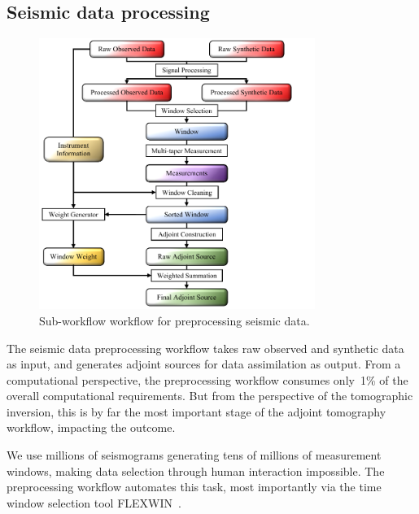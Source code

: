 \documentclass[extra,mreferee]{gji}
\begin{document}
\subsection{Seismic data processing}

\begin{figure}
  \centering
  \includegraphics[width=0.8\textwidth]{figures/Preprocess_workflow.pdf}
  \caption{\small{Sub-workflow workflow for preprocessing seismic data.}}
  \label{fig:preprocess_workflow}
\end{figure}

The seismic data preprocessing workflow takes raw observed and synthetic data as input,
and generates adjoint sources for data assimilation as output.
From a computational perspective, the preprocessing workflow consumes only~1\%
of the overall computational requirements.
But from the perspective of the tomographic inversion, this is by far the most
important stage of the adjoint tomography workflow,
impacting the outcome.

We use millions of seismograms generating tens of millions of measurement windows,
making data selection through human interaction impossible.
The preprocessing workflow automates this task,
most importantly via the time window selection tool FLEXWIN~\citep{maggi2009automated}.
\end{document}
